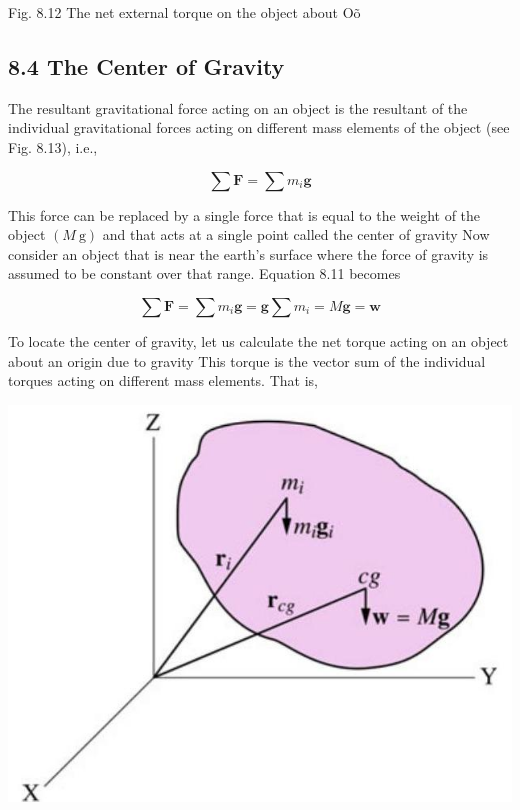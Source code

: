 \documentclass[10pt]{article}
\begin{document}
Fig. 8.12 The net external torque on the object about Oõ

\subsection*{8.4 The Center of Gravity}
The resultant gravitational force acting on an object is the resultant of the individual gravitational forces acting on different mass elements of the object (see Fig. 8.13), i.e.,


\begin{equation*}
\sum \mathbf{F}=\sum m_{i} \mathbf{g} \tag{8.11}
\end{equation*}


This force can be replaced by a single force that is equal to the weight of the object $(M \mathrm{~g})$ and that acts at a single point called the center of gravity Now consider an object that is near the earth's surface where the force of gravity is assumed to be constant over that range. Equation 8.11 becomes

$$
\sum \mathbf{F}=\sum m_{i} \mathbf{g}=\mathbf{g} \sum m_{i}=M \mathbf{g}=\mathbf{w}
$$

To locate the center of gravity, let us calculate the net torque acting on an object about an origin due to gravity This torque is the vector sum of the individual torques acting on different mass elements. That is,

\begin{center}
\includegraphics[max width=\textwidth]{2024_09_13_db1f357d2aad0a03eb2eg-136(1)}
\end{center}
\end{document}
